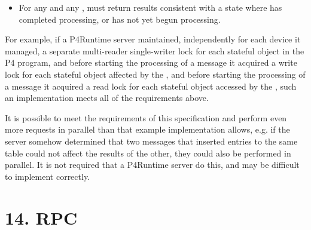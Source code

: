 \documentclass[11pt]{article}
\begin{document}
{\begin{itemize}[noitemsep,topsep=\mdcompacttopsep]
\item{}For any   and any  ,  must
return results consistent with a state where  has completed
processing, or  has not yet begun processing.%
\end{itemize}%

\noindent{}For example, if a P4Runtime server maintained, independently for each
device it managed, a separate multi-reader single-writer lock for each
stateful object in the P4 program, and before starting the processing
of a  message it acquired a write lock for each stateful
object affected by the , and before starting the
processing of a  message it acquired a read lock for each
stateful object accessed by the , such an implementation
meets all of the requirements above.%

It is possible to meet the requirements of this specification and
perform even more requests in parallel than that example
implementation allows, e.g. if the server somehow determined that two
 messages that inserted entries to the same table could
not affect the results of the other, they could also be performed in
parallel.  It is not required that a P4Runtime server do this, and may
be difficult to implement correctly.%

\section{14.\hspace*{0.5em} RPC}\label{sec-setforwardingpipelineconfig-rpc}%

}
\end{document}
